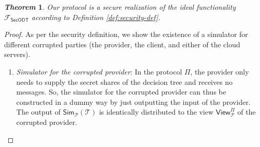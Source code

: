 \documentclass[10pt,journal,compsoc]{IEEEtran}
\newtheorem{theorem}{\textbf{\emph{Theorem}}}
\begin{document}
\begin{theorem}
\label{thm:security-guarantee}
Our protocol is a secure realization of the ideal functionality $\mathcal{F}_{\mathsf{SecODT}}$ according to Definition \ref{def:security-def}. 
\end{theorem}



\begin{proof}
%
As per the security definition, we show the existence of a simulator for different corrupted parties (the provider, the client, and either of the cloud servers).
%


\begin{enumerate}[-]

\item \emph{Simulator for the corrupted provider}:
%
In the protocol $\Pi$, the provider only needs to supply the secret shares of the decision tree and receives no messages.
%
So, the simulator for the corrupted provider can thus be constructed in a dummy way by just outputting the input of the provider.
%
The output of $\mathsf{Sim}_{\mathcal{P}}(\mathcal{T})$ is identically distributed to the view $\mathsf{View}^{\Pi}_{\mathcal{P}}$ of the corrupted provider.






\end{enumerate}
\end{proof}
\end{document}
